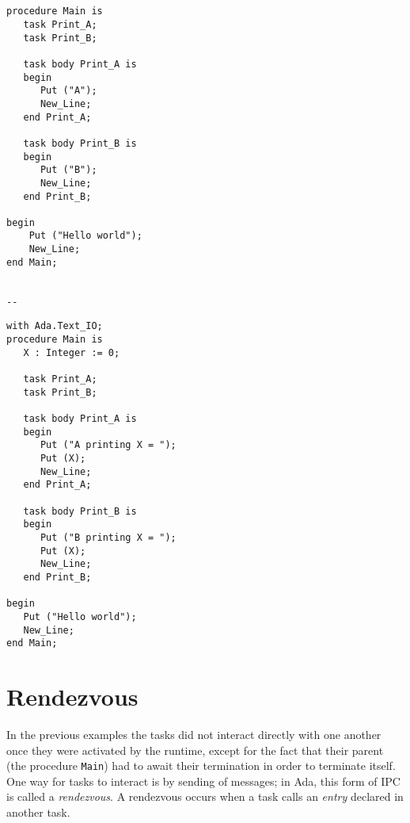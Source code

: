 \begin{minipage}{0.45\linewidth}
\lstset{language=ada}
\begin{lstlisting}[caption=Tasks in a procedure,label=tasks_in_proc]


procedure Main is
   task Print_A;
   task Print_B;

   task body Print_A is
   begin
      Put ("A");
      New_Line;
   end Print_A;

   task body Print_B is
   begin
      Put ("B");
      New_Line;
   end Print_B;

begin
	Put ("Hello world");
	New_Line;
end Main;


--
\end{lstlisting}
\end{minipage}
\hspace{5mm}
\begin{minipage}{0.45\linewidth}
\lstset{language=ada}
\begin{lstlisting}[caption=Sharing of data in tasks,label=shared_data]
with Ada.Text_IO;
procedure Main is
   X : Integer := 0;

   task Print_A;
   task Print_B;

   task body Print_A is
   begin
      Put ("A printing X = ");
      Put (X);
      New_Line;
   end Print_A;

   task body Print_B is
   begin
      Put ("B printing X = ");
      Put (X);
      New_Line;
   end Print_B;

begin
   Put ("Hello world");
   New_Line;
end Main;
\end{lstlisting}
\end{minipage}

\section{Rendezvous}
In the previous examples the tasks did not interact directly with one
another once they were activated by the runtime, except for the fact
that their parent (the procedure \texttt{Main}) had to await their
termination in order to terminate itself. One way for tasks to
interact is by sending of messages; in Ada, this form of IPC is called
a \emph{rendezvous}. A rendezvous occurs when a task calls an
\emph{entry} declared in another task.

